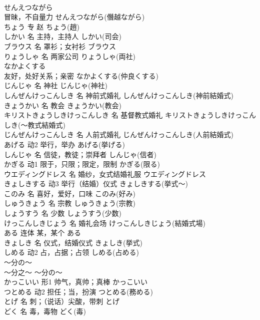 \documentclass[8pt]{extreport}
\begin{document}
\begin{CJK}{UTF8}{min}
\\	せんえつながら	
\\	冒昧，不自量力	せんえつながら(僭越ながら)	
\\	ちょう	专	赵	ちょう(趙)	
\\	しかい	名	主持，主持人	しかい(司会)	
\\	ブラウス	名	罩衫；女衬衫	ブラウス	
\\	りょうしゃ	名	两家公司	りょうしゃ(両社)	
\\	なかよくする	
\\	友好，处好关系；亲密	なかよくする(仲良くする)	
\\	じんじゃ	名	神社	じんじゃ(神社)	
\\	しんぜんけっこんしき	名	神前式婚礼	しんぜんけっこんしき(神前結婚式)	
\\	きょうかい	名	教会	きょうかい(教会)	
\\	キリストきょうしきけっこんしき	名	基督教式婚礼	キリストきょうしきけっこんしき(～教式結婚式)	
\\	じんぜんけっこんしき	名	人前式婚礼	じんぜんけっこんしき(人前結婚式)	
\\	あげる	动2	举行，举办	あげる(挙げる)	
\\	しんじゃ	名	信徒，教徒；崇拜者	しんじゃ(信者)	
\\	かぎる	动1	限于，只限；限定，限制	かぎる(限る)	
\\	ウエディングドレス	名	婚纱，女式结婚礼服	ウエディングドレス	
\\	きょしきする	动3	举行（结婚）仪式	きょしきする(挙式～)	
\\	このみ	名	喜好，爱好，口味	このみ(好み)	
\\	しゅうきょう	名	宗教	しゅうきょう(宗教)	
\\	しょうすう	名	少数	しょうすう(少数)	
\\	けっこんしきじょう	名	婚礼会场	けっこんしきじょう(結婚式場)	
\\	ある	连体	某，某个	ある	
\\	きょしき	名	仪式，结婚仪式	きょしき(挙式)	
\\	しめる	动2	占，占据；占领	しめる(占める)	
\\	～分の～	
\\	～分之～	～分の～	
\\	かっこいい	形1	帅气，真帅；真棒	かっこいい	
\\	つとめる	动2	担任；当，扮演	つとめる(務める)	
\\	とげ	名	刺；（说话）尖酸，带刺	とげ	
\\	どく	名	毒，毒物	どく(毒)	

\end{CJK}
\end{document}
